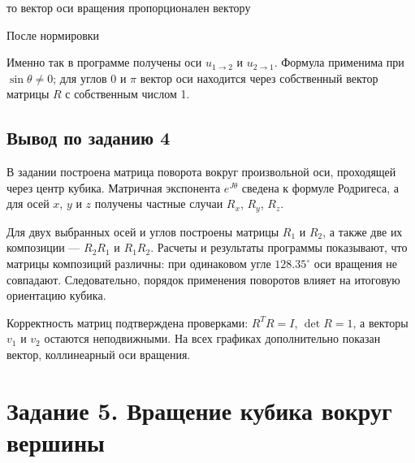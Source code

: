 \documentclass[a4paper,14pt]{extarticle}
\begin{document}
то вектор оси вращения пропорционален вектору

\begin{center}\end{center}

После нормировки

\begin{center}\end{center}

Именно так в программе получены оси $u_{1 \to 2}$ и $u_{2 \to 1}$. Формула применима при $\sin\theta \neq 0$; для углов $0$ и $\pi$ вектор оси находится через собственный вектор матрицы $R$ с собственным числом 1.

\par\noindent\begin{minipage}{\linewidth}
\subsection*{Вывод по заданию 4}

В задании построена матрица поворота вокруг произвольной оси, проходящей через центр кубика. Матричная экспонента $e^{J\theta}$ сведена к формуле Родригеса, а для осей $x$, $y$ и $z$ получены частные случаи $R_x$, $R_y$, $R_z$.

Для двух выбранных осей и углов построены матрицы $R_1$ и $R_2$, а также две их композиции — $R_2R_1$ и $R_1R_2$. Расчеты и результаты программы показывают, что матрицы композиций различны: при одинаковом угле $128.35^\circ$ оси вращения не совпадают. Следовательно, порядок применения поворотов влияет на итоговую ориентацию кубика.

Корректность матриц подтверждена проверками: $R^TR=I$, $\det R=1$, а векторы $v_1$ и $v_2$ остаются неподвижными. На всех графиках дополнительно показан вектор, коллинеарный оси вращения.

\end{minipage}\par
\section{Задание 5. Вращение кубика вокруг вершины}
\end{document}
